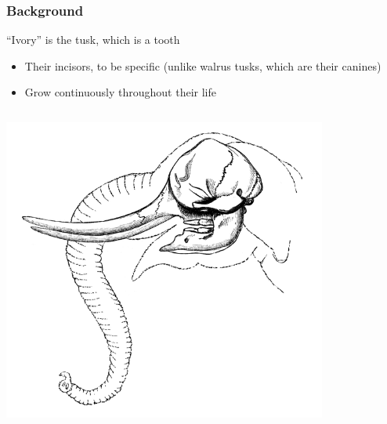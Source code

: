 \documentclass[10pt]{beamer}
\begin{document}
\begin{frame}[t]
\frametitle{Background}
\vspace{0.5cm}

	``Ivory'' is the tusk, which is a tooth
		\begin{itemize}
			\item Their incisors, to be specific (unlike walrus tusks, which are their canines)
			\item Grow continuously throughout their life
		\end{itemize}
	
	\vspace{0.25cm}
	
	
	\begin{columns}
		\begin{column}{0.5\textwidth}
			\begin{center}
				\includegraphics[width=0.8\textwidth]{figures/skull1.png}
			\end{center}
		\end{column}
		

\end{columns}
\end{frame}
\end{document}
